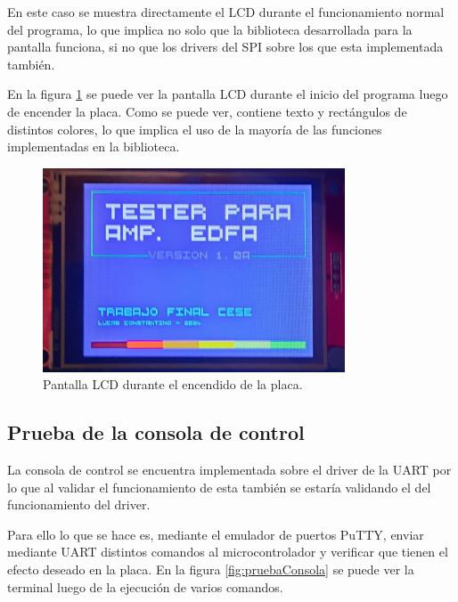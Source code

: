 En este caso se muestra directamente el LCD durante el funcionamiento normal del programa, lo que implica no solo que la biblioteca desarrollada para la pantalla funciona, si no que los drivers del SPI sobre los que esta implementada también.

En la figura \ref{fig:testLCD} se puede ver la pantalla LCD durante el inicio del programa luego de encender la placa. Como se puede ver, contiene texto y rectángulos de distintos colores, lo que implica el uso de la mayoría de las funciones implementadas en la biblioteca.

\begin{figure}[H]
\centering
\includegraphics[width=0.8\textwidth]{./Figures/testLCD.jpg}
\caption{Pantalla LCD durante el encendido de la placa.}
\label{fig:testLCD}
\end{figure}

\subsection{Prueba de la consola de control}

La consola de control se encuentra implementada sobre el driver de la UART por lo que al validar el funcionamiento de esta también se estaría validando el del funcionamiento del driver.

Para ello lo que se hace es, mediante el emulador de puertos PuTTY, enviar mediante UART distintos comandos al microcontrolador y verificar que tienen el efecto deseado en la placa. En la figura \ref{fig:pruebaConsola} se puede ver la terminal luego de la ejecución de varios comandos.

